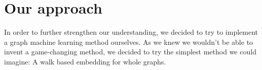 \section{Our approach}
In order to further strengthen our understanding, we decided to try to implement a graph machine learning method ourselves.
As we knew we wouldn't be able to invent a game-changing method, we decided to try the simplest method we could imagine: A walk based embedding for whole graphs.